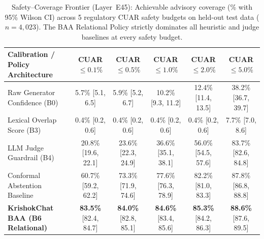 \begin{table}[t]
\centering\small
\caption{Safety--Coverage Frontier (Layer~E45): Achievable advisory coverage (\% with 95\% Wilson CI) across 5 regulatory CUAR safety budgets on held-out test data ($n=4{,}023$). The BAA Relational Policy strictly dominates all heuristic and judge baselines at every safety budget.}
\label{tab:safety_coverage_frontier}
\begin{tabular}{lccccc}
\toprule
\textbf{Calibration / Policy Architecture} & \textbf{CUAR $\le 0.1\%$} & \textbf{CUAR $\le 0.5\%$} & \textbf{CUAR $\le 1.0\%$} & \textbf{CUAR $\le 2.0\%$} & \textbf{CUAR $\le 5.0\%$} \\
\midrule
Raw Generator Confidence (B0) & 5.7\% [5.1, 6.5] & 5.9\% [5.2, 6.7] & 10.2\% [9.3, 11.2] & 12.4\% [11.4, 13.5] & 38.2\% [36.7, 39.7] \\
Lexical Overlap Score (B3) & 0.4\% [0.2, 0.6] & 0.4\% [0.2, 0.6] & 0.4\% [0.2, 0.6] & 0.4\% [0.2, 0.6] & 7.7\% [7.0, 8.6] \\
LLM Judge Guardrail (B4) & 20.8\% [19.6, 22.1] & 23.6\% [22.3, 24.9] & 36.6\% [35.1, 38.1] & 56.0\% [54.5, 57.6] & 83.7\% [82.6, 84.8] \\
Conformal Abstention Baseline & 60.7\% [59.2, 62.2] & 73.3\% [71.9, 74.6] & 77.6\% [76.3, 78.9] & 82.2\% [81.0, 83.3] & 87.8\% [86.8, 88.8] \\
\textbf{KrishokChat BAA (B6 Relational)} & \textbf{83.5\%} [82.4, 84.7] & \textbf{84.0\%} [82.8, 85.1] & \textbf{84.6\%} [83.4, 85.6] & \textbf{85.3\%} [84.2, 86.3] & \textbf{88.6\%} [87.6, 89.5] \\
\bottomrule
\end{tabular}
\end{table}
